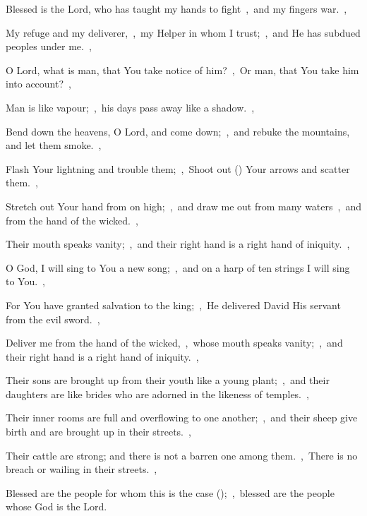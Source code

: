 \documentclass[12pt,twoside,a5paper]{article}
\begin{document}
\begin{normalparskip}
  Blessed is the Lord, who has taught my hands to fight~\sep\ and my fingers war.~\sep


  My refuge and my deliverer,~\sep\ my Helper in whom I trust;~\sep\ and He has subdued peoples under me.~\sep

  O Lord, what is man, that You take notice of him?~\sep\ Or man, that You take him into account?~\sep

  Man is like vapour;~\sep\ his days pass away like a shadow.~\sep

  Bend down the heavens, O Lord, and come down;~\sep\ and rebuke the mountains, and let them smoke.~\sep

  Flash Your lightning and trouble them;~\sep\ Shoot out () Your arrows and scatter them.~\sep

  Stretch out Your hand from on high;~\sep\ and draw me out from many waters~\sep\ and from the hand of the wicked.~\sep

  Their mouth speaks vanity;~\sep\ and their right hand is a right hand of iniquity.~\sep

  O God, I will sing to You a new song;~\sep\ and on a harp of ten strings I will sing to You.~\sep

  For You have granted salvation to the king;~\sep\ He delivered David His servant from the evil sword.~\sep

  Deliver me from the hand of the wicked,~\sep\ whose mouth speaks vanity;~\sep\ and their right hand is a right hand of iniquity.~\sep

  Their sons are brought up from their youth like a young plant;~\sep\ and their daughters are like brides who are adorned in the likeness of temples.~\sep

  Their inner rooms are full and overflowing to one another;~\sep\ and their sheep give birth and are brought up in their streets.~\sep

  Their cattle are strong; and there is not a barren one among them.~\sep\ There is no breach or wailing in their streets.~\sep

  Blessed are the people for whom this is the case ();~\sep\ blessed are the people whose God is the Lord.
\end{normalparskip}

\end{document}
